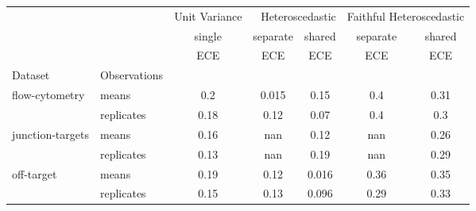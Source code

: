 \begin{tabular}{ll|c|cc|cc}
\toprule
{} & {} & {Unit Variance} & \multicolumn{2}{r}{Heteroscedastic} & \multicolumn{2}{r}{Faithful Heteroscedastic} \\
{} & {} & {single} & {separate} & {shared} & {separate} & {shared} \\
{} & {} & {ECE} & {ECE} & {ECE} & {ECE} & {ECE} \\
{Dataset} & {Observations} & {} & {} & {} & {} & {} \\
\midrule
\multirow[c]{2}{*}{flow-cytometry} & means & 0.2 & 0.015 & 0.15 & 0.4 & 0.31 \\
 & replicates & 0.18 & 0.12 & 0.07 & 0.4 & 0.3 \\
\multirow[c]{2}{*}{junction-targets} & means & 0.16 & nan & 0.12 & nan & 0.26 \\
 & replicates & 0.13 & nan & 0.19 & nan & 0.29 \\
\multirow[c]{2}{*}{off-target} & means & 0.19 & 0.12 & 0.016 & 0.36 & 0.35 \\
 & replicates & 0.15 & 0.13 & 0.096 & 0.29 & 0.33 \\
\bottomrule
\end{tabular}
